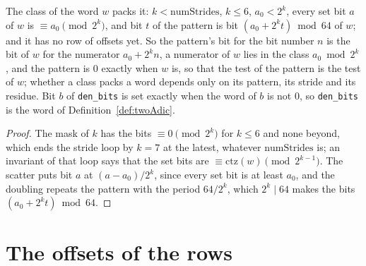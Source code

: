 \begin{lemma}\label{lem:numClasses}
  \leanok
  The class of the word $w$ packs it: $k < \mathrm{numStrides}$, $k \le 6$, $a_0 < 2^k$, every set
  bit $a$ of $w$ is $\equiv a_0 \pmod{2^k}$, and bit $t$ of the pattern is bit
  $(a_0 + 2^k t) \bmod 64$ of $w$; and it has no row of offsets yet. So the pattern's bit for the
  bit number $n$ is the bit of $w$ for the numerator $a_0 + 2^k n$, a numerator of $w$ lies in the
  class $a_0 \bmod 2^k$, and the pattern is $0$ exactly when $w$ is, so that the test of the pattern
  is the test of $w$; whether a class packs a word depends only on its pattern, its stride and its
  residue. Bit $b$ of \verb|den_bits| is set exactly when the word of $b$ is not $0$, so
  \verb|den_bits| is the word of Definition~\ref{def:twoAdic}.
\end{lemma}

\begin{proof}
  \leanok
  The mask of $k$ has the bits $\equiv 0 \pmod{2^k}$ for $k \le 6$ and none beyond, which ends the
  stride loop by $k = 7$ at the latest, whatever $\mathrm{numStrides}$ is; an invariant of that loop
  says that the set bits are $\equiv \mathrm{ctz}(w) \pmod{2^{k-1}}$. The scatter puts bit $a$ at
  $(a - a_0)/2^k$, since every set bit is at least $a_0$, and the doubling repeats the pattern with
  the period $64/2^k$, which $2^k \mid 64$ makes the bits $(a_0 + 2^k t) \bmod 64$.
\end{proof}

\section{The offsets of the rows}\label{sec:offsets}

